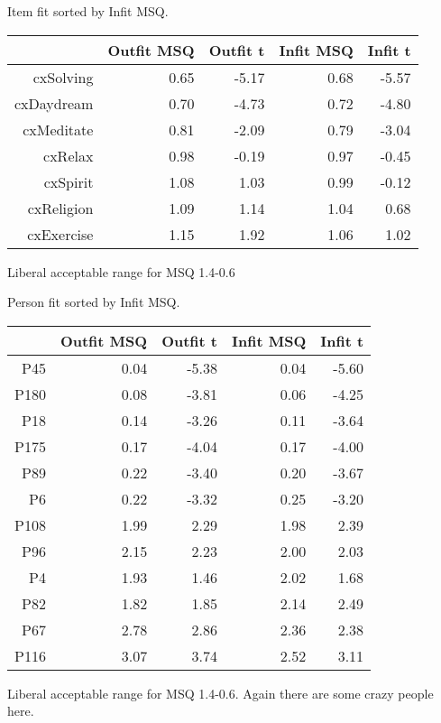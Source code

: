\documentclass[10pt,utf8x]{beamer}
\begin{document}
\begin{frame}
Item fit sorted by Infit MSQ.
\begin{table}[ht]
\begin{center}
\begin{tabular}{rrrrr}
  \hline
 & Outfit MSQ & Outfit t & Infit MSQ & Infit t \\ 
  \hline
cxSolving & 0.65 & -5.17 & 0.68 & -5.57 \\ 
  cxDaydream & 0.70 & -4.73 & 0.72 & -4.80 \\ 
  cxMeditate & 0.81 & -2.09 & 0.79 & -3.04 \\ 
  cxRelax & 0.98 & -0.19 & 0.97 & -0.45 \\ 
  cxSpirit & 1.08 & 1.03 & 0.99 & -0.12 \\ 
  cxReligion & 1.09 & 1.14 & 1.04 & 0.68 \\ 
  cxExercise & 1.15 & 1.92 & 1.06 & 1.02 \\ 
   \hline
\end{tabular}
\end{center}
\end{table}
Liberal acceptable range for MSQ 1.4-0.6
\end{frame}

\begin{frame}
Person fit sorted by Infit MSQ.
\begin{table}[ht]
\begin{center}
\begin{tabular}{rrrrr}
  \hline
 & Outfit MSQ & Outfit t & Infit MSQ & Infit t \\ 
  \hline
P45 & 0.04 & -5.38 & 0.04 & -5.60 \\ 
  P180 & 0.08 & -3.81 & 0.06 & -4.25 \\ 
  P18 & 0.14 & -3.26 & 0.11 & -3.64 \\ 
  P175 & 0.17 & -4.04 & 0.17 & -4.00 \\ 
  P89 & 0.22 & -3.40 & 0.20 & -3.67 \\ 
  P6 & 0.22 & -3.32 & 0.25 & -3.20 \\ 
  P108 & 1.99 & 2.29 & 1.98 & 2.39 \\ 
  P96 & 2.15 & 2.23 & 2.00 & 2.03 \\ 
  P4 & 1.93 & 1.46 & 2.02 & 1.68 \\ 
  P82 & 1.82 & 1.85 & 2.14 & 2.49 \\ 
  P67 & 2.78 & 2.86 & 2.36 & 2.38 \\ 
  P116 & 3.07 & 3.74 & 2.52 & 3.11 \\ 
   \hline
\end{tabular}
\end{center}
\end{table}
Liberal acceptable range for MSQ 1.4-0.6. Again there are some
crazy people here.
\end{frame}
\end{document}
